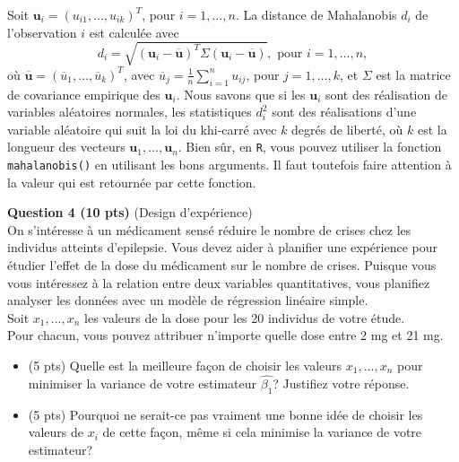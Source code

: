 \begin{questions}
{{\vspace{0.5cm}
Soit $\boldsymbol{u}_i=(u_{i1},\hdots,u_{ik})^T $, pour $i=1,\hdots,n$.
La distance de Mahalanobis $d_i$ de l'observation $i$ est calculée avec
    \begin{equation*}
        d_i=\sqrt{(\boldsymbol{u}_i - \overline{\boldsymbol{u}})^T\Sigma (\boldsymbol{u}_i - \overline{\boldsymbol{u}})}, \text{ pour }i=1,\hdots,n,
    \end{equation*}
où $\overline{\boldsymbol{u}}=(\overline{u}_{1},\hdots,\overline{u}_{k})^T$, avec $\overline{u}_{j}=\frac{1}{n}\sum_{i=1}^n u_{ij}$, pour $j=1,\hdots,k$, et $\Sigma$ est la matrice de covariance empirique des $\boldsymbol{u}_i$. 
Nous savons que si les $\boldsymbol{u}_i$ sont des réalisation de variables aléatoires normales, les statistiques $d_i^2$ sont des réalisations d'une variable aléatoire qui suit la loi du khi-carré avec $k$ degrés de liberté, où $k$ est la longueur des vecteurs $\boldsymbol{u}_1,\hdots, \boldsymbol{u}_n$.
Bien sûr, en \texttt{R}, vous pouvez utiliser la fonction \texttt{mahalanobis()} en utilisant les bons arguments. Il faut toutefois faire attention à la valeur qui est retournée par cette fonction.
}
}
\end{questions}







\vspace{0.3in}
\textbf{Question 4 (10 pts)} (Design d'expérience)\\

On s'intéresse à un médicament sensé réduire le nombre de crises chez les individus atteints d'epilepsie. Vous devez aider à planifier une expérience pour étudier l'effet de la dose du médicament sur le nombre de crises. Puisque vous vous intéressez à la relation entre deux variables quantitatives, vous planifiez analyser les données avec un modèle de régression linéaire simple. \\

Soit $x_1, \ldots, x_n$ les valeurs de la dose pour les 20 individus de votre étude.\\ Pour chacun, vous pouvez attribuer n'importe quelle dose entre 2 mg et 21 mg. \\

\begin{itemize}
\item [(a)] (5 pts) Quelle est la meilleure fa\c{c}on de choisir les valeurs $x_1,\ldots,x_n$ pour minimiser la variance de votre estimateur $\widehat{\beta_1}$? Justifiez votre réponse.
\vspace{0.1 in}
\item [(b)] (5 pts) Pourquoi ne serait-ce pas vraiment une bonne idée de choisir les valeurs de $x_i$ de cette façon, même si cela minimise la variance de votre estimateur?
\end{itemize}

 